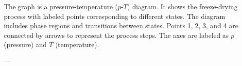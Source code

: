 The graph is a pressure-temperature (\( p \)-\( T \)) diagram. It shows the freeze-drying process with labeled points corresponding to different states. The diagram includes phase regions and transitions between states. Points 1, 2, 3, and 4 are connected by arrows to represent the process steps. The axes are labeled as \( p \) (pressure) and \( T \) (temperature).

---